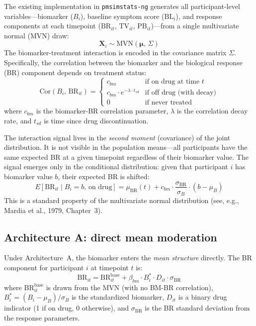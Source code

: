 \documentclass[11pt]{article}
\begin{document}
The existing implementation in \texttt{pmsimstats-ng}
generates all participant-level variables---biomarker ($B_i$),
baseline symptom score ($\text{BL}_i$), and response
components at each timepoint ($\text{BR}_{it}$,
$\text{TV}_{it}$, $\text{PB}_{it}$)---from a single
multivariate normal (MVN) draw:
%
\begin{equation}
  \mathbf{X}_i \sim \text{MVN}(\boldsymbol{\mu},\,\Sigma)
\end{equation}
%
The biomarker-treatment interaction is encoded in the
covariance matrix $\Sigma$. Specifically, the correlation
between the biomarker and the biological response (BR)
component depends on treatment status:
%
\begin{equation}\label{eq:mvn-cor}
  \text{Cor}(B_i,\,\text{BR}_{it}) =
  \begin{cases}
    c_{bm} & \text{if on drug at time } t \\
    c_{bm} \cdot e^{-\lambda \cdot t_{sd}} &
      \text{if off drug (with decay)} \\
    0 & \text{if never treated}
  \end{cases}
\end{equation}
%
where $c_{bm}$ is the biomarker-BR correlation parameter,
$\lambda$ is the correlation decay rate, and $t_{sd}$ is time
since drug discontinuation.

The interaction signal lives in the \emph{second moment}
(covariance) of the joint distribution. It is not visible in
the population means---all participants have the same expected
BR at a given timepoint regardless of their biomarker value.
The signal emerges only in the conditional distribution:
given that participant $i$ has biomarker value $b$, their
expected BR is shifted:
%
\begin{equation}\label{eq:cond-exp}
  E[\text{BR}_{it} \mid B_i = b,\,\text{on drug}]
  = \mu_{\text{BR}}(t) + c_{bm} \cdot
    \frac{\sigma_{\text{BR}}}{\sigma_B}
    \cdot (b - \mu_B)
\end{equation}
%
This is a standard property of the multivariate normal
distribution (see, e.g., Mardia et al., 1979, Chapter~3).

\subsection{Architecture A: direct mean moderation}

Under Architecture~A, the biomarker enters the
\emph{mean structure} directly. The BR component for
participant $i$ at timepoint $t$ is:
%
\begin{equation}\label{eq:arch-a}
  \text{BR}_{it} = \text{BR}_{it}^{\text{base}}
  + \beta_{bm} \cdot B_i^{*} \cdot D_{it} \cdot \sigma_{\text{BR}}
\end{equation}
%
where $\text{BR}_{it}^{\text{base}}$ is drawn from the MVN
(with no BM-BR correlation), $B_i^{*} = (B_i - \mu_B) /
\sigma_B$ is the standardized biomarker, $D_{it}$ is a binary
drug indicator (1 if on drug, 0 otherwise), and
$\sigma_{\text{BR}}$ is the BR standard deviation from the
response parameters.
\end{document}
